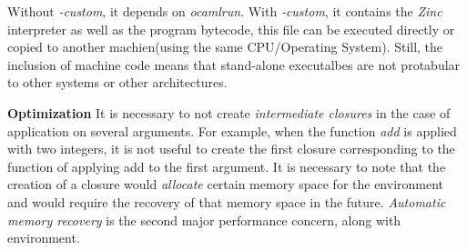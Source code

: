 
Without \textit{-custom}, it depends on \textit{ocamlrun}. With
\textit{-custom}, it contains the \textit{Zinc} interpreter as well as
the program bytecode, this file can be executed directly or copied to
another machien(using the same CPU/Operating System).  Still, the
inclusion of machine code means that stand-alone executalbes are not
protabular to other systems or other architectures.

\textbf{Optimization} It is necessary to not create \textit{intermediate
  closures} in the case of application on several arguments. For
example, when the function \textit{add} is applied with two integers,
it is not useful to create the first closure corresponding to the
function of applying add to the first argument. It is necessary to
note that the creation of a closure would \textit{allocate} certain
memory space for the environment and would require the recovery of
that memory space in the future. \textit{Automatic memory recovery} is
the second major performance concern, along with environment.

